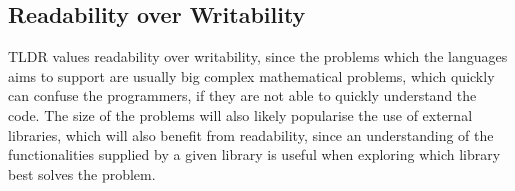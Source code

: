 \subsection{Readability over Writability}

TLDR values readability over writability, since the problems which the languages aims to support are usually big complex mathematical problems, which quickly can confuse the programmers, if they are not able to quickly understand the code. The size of the problems will also likely popularise the use of external libraries, which will also benefit from readability, since an understanding of the functionalities supplied by a given library is useful when exploring which library best solves the problem.





%